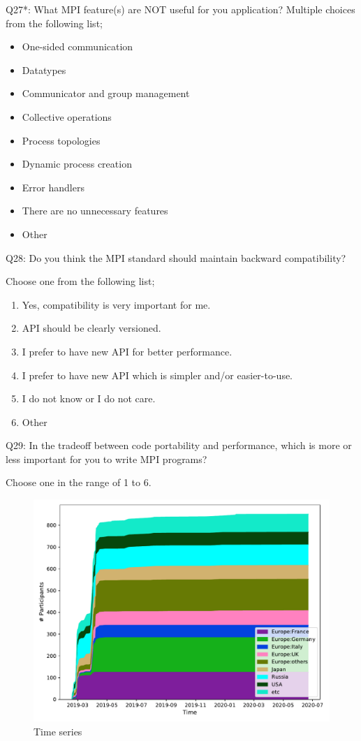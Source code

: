 \begin{description}
\item{Q27*:} What MPI feature(s) are NOT useful for you application?
Multiple choices from the following list;
\begin{itemize}
\item One-sided communication
\item Datatypes
\item Communicator and group management
\item Collective operations
\item Process topologies
\item Dynamic process creation
\item Error handlers
\item There are no unnecessary features
\item Other
\end{itemize}

\item{Q28:} Do you think the MPI standard should maintain backward
compatibility? 

Choose one from the following list;
\begin{enumerate}
\item Yes, compatibility is very important for me.
\item API should be clearly versioned.
\item I prefer to have new API for better performance.
\item I prefer to have new API which is simpler and/or easier-to-use.
\item I do not know or I do not care.
\item Other
\end{enumerate}

\item{Q29:} In the tradeoff between code portability and performance,
which is more or less important for you to write MPI programs? 

Choose one in the range of 1 to 6.

\end{description}



\begin{figure}[htb]
\begin{center}
\includegraphics[width=12cm]{../pdfs/TimeSeries.pdf}
\caption{Time series}
\label{fig:timeseries}
\end{center}
\end{figure}
